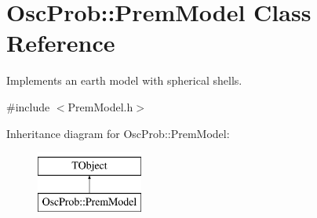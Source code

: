 \hypertarget{classOscProb_1_1PremModel}{}\section{Osc\+Prob\+:\+:Prem\+Model Class Reference}
\label{classOscProb_1_1PremModel}


Implements an earth model with spherical shells.  




{\ttfamily \#include $<$Prem\+Model.\+h$>$}

Inheritance diagram for Osc\+Prob\+:\+:Prem\+Model\+:\begin{figure}[H]
\begin{center}
\leavevmode
\includegraphics[height=2.000000cm]{classOscProb_1_1PremModel}
\end{center}
\end{figure}
